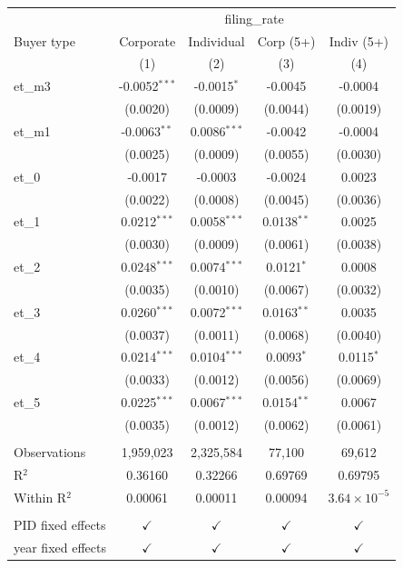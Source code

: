 
\begingroup
\centering
\begin{tabular}{lcccc}
   \toprule
    & \multicolumn{4}{c}{filing\_rate}\\
   Buyer type         & Corporate       & Individual     & Corp (5+)     & Indiv (5+) \\   
                      & (1)             & (2)            & (3)           & (4)\\  
   \midrule 
   et\_m3             & -0.0052$^{***}$ & -0.0015$^{*}$  & -0.0045       & -0.0004\\   
                      & (0.0020)        & (0.0009)       & (0.0044)      & (0.0019)\\   
   et\_m1             & -0.0063$^{**}$  & 0.0086$^{***}$ & -0.0042       & -0.0004\\   
                      & (0.0025)        & (0.0009)       & (0.0055)      & (0.0030)\\   
   et\_0              & -0.0017         & -0.0003        & -0.0024       & 0.0023\\   
                      & (0.0022)        & (0.0008)       & (0.0045)      & (0.0036)\\   
   et\_1              & 0.0212$^{***}$  & 0.0058$^{***}$ & 0.0138$^{**}$ & 0.0025\\   
                      & (0.0030)        & (0.0009)       & (0.0061)      & (0.0038)\\   
   et\_2              & 0.0248$^{***}$  & 0.0074$^{***}$ & 0.0121$^{*}$  & 0.0008\\   
                      & (0.0035)        & (0.0010)       & (0.0067)      & (0.0032)\\   
   et\_3              & 0.0260$^{***}$  & 0.0072$^{***}$ & 0.0163$^{**}$ & 0.0035\\   
                      & (0.0037)        & (0.0011)       & (0.0068)      & (0.0040)\\   
   et\_4              & 0.0214$^{***}$  & 0.0104$^{***}$ & 0.0093$^{*}$  & 0.0115$^{*}$\\   
                      & (0.0033)        & (0.0012)       & (0.0056)      & (0.0069)\\   
   et\_5              & 0.0225$^{***}$  & 0.0067$^{***}$ & 0.0154$^{**}$ & 0.0067\\   
                      & (0.0035)        & (0.0012)       & (0.0062)      & (0.0061)\\   
    \\
   Observations       & 1,959,023       & 2,325,584      & 77,100        & 69,612\\  
   R$^2$              & 0.36160         & 0.32266        & 0.69769       & 0.69795\\  
   Within R$^2$       & 0.00061         & 0.00011        & 0.00094       & $3.64\times 10^{-5}$\\   
    \\
   PID fixed effects  & $\checkmark$    & $\checkmark$   & $\checkmark$  & $\checkmark$\\   
   year fixed effects & $\checkmark$    & $\checkmark$   & $\checkmark$  & $\checkmark$\\   
   \bottomrule
\end{tabular}
\par\endgroup


